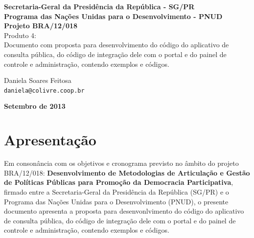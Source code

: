 \documentclass[11pt]{article}
\begin{document}
\lstset{language=Ruby}
\begin{titlepage}
  \begin{center}
   {\Large \textbf{Secretaria-Geral da Presidência da República - SG/PR}\\
    \Large \textbf{Programa das Nações Unidas para o Desenvolvimento -
PNUD}} \\[2cm]

   {\large \textbf{Projeto BRA/12/018}}\\[2cm]

   {\large {Produto 4:\\
     Documento com proposta para desenvolvimento do
     código do aplicativo de consulta pública, do código de
     integração dele com o portal e do painel de controle e
     administração, contendo exemplos e códigos.}}\\[5cm]

   \begin{minipage}{\textwidth}
    Daniela Soares Feitosa\\
    \texttt{daniela@colivre.coop.br}\\[2cm]
  \end{minipage}
  \vfill

\vspace{2cm}

\large \textbf{Setembro de 2013}
\end{center}
\end{titlepage}

\tableofcontents
\clearpage
\listoffigures

\clearpage

\section{Apresentação}

Em consonância com os objetivos e cronograma previsto no âmbito do
projeto BRA/12/018:
\textbf{Desenvolvimento de Metodologias de Articulação e Gestão de
Políticas Públicas para Promoção da Democracia Participativa},
firmado entre a Secretaria-Geral da Presidência da República
(SG/PR) e o Programa das Nações Unidas para o Desenvolvimento (PNUD),
o presente documento apresenta a proposta para
desenvonlvimento do código do aplicativo de consulta pública, do código
de integração dele com o portal e do painel de controle e
administração, contendo exemplos e códigos.
\end{document}
